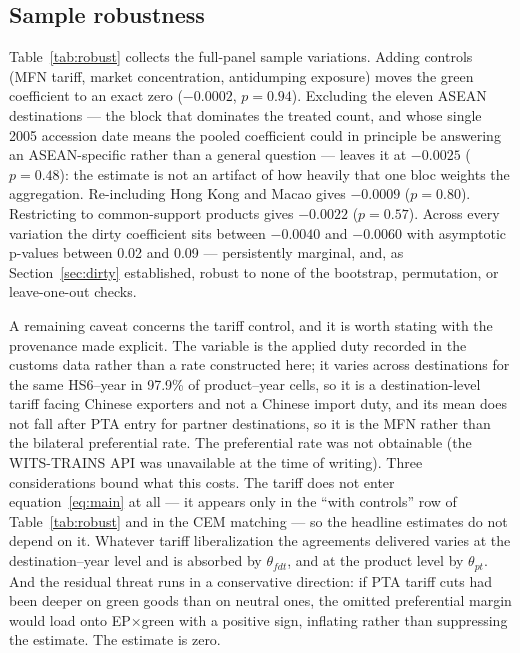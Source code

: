 \documentclass[12pt]{article}
\begin{document}
\subsection{Sample robustness}

Table~\ref{tab:robust} collects the full-panel sample variations. Adding controls (MFN
tariff, market concentration, antidumping exposure) moves the green coefficient to an
exact zero ($-0.0002$, $p=0.94$). Excluding the eleven ASEAN destinations --- the block
that dominates the treated count, and whose single 2005 accession date means the
pooled coefficient could in principle be answering an ASEAN-specific rather than a
general question --- leaves it at $-0.0025$ ($p=0.48$): the estimate is not an artifact
of how heavily that one bloc weights the aggregation. Re-including
Hong Kong and Macao gives $-0.0009$ ($p=0.80$). Restricting to common-support products
gives $-0.0022$ ($p=0.57$). Across every variation the dirty coefficient sits between
$-0.0040$ and $-0.0060$ with asymptotic p-values between 0.02 and 0.09 --- persistently
marginal, and, as Section~\ref{sec:dirty} established, robust to none of the bootstrap,
permutation, or leave-one-out checks.

\begin{table}[htbp]
\centering
\caption{Sample robustness (full firm-level panel, WB index)}
\label{tab:robust}

\end{table}

A remaining caveat concerns the tariff control, and it is worth stating with the
provenance made explicit. The variable is the applied duty recorded in the customs data
rather than a rate constructed here; it varies across destinations for the same
HS6--year in 97.9\% of product--year cells, so it is a destination-level tariff facing
Chinese exporters and not a Chinese import duty, and its mean does not fall after PTA
entry for partner destinations, so it is the MFN rather than the bilateral preferential
rate. The preferential rate was not obtainable (the WITS-TRAINS API was unavailable at
the time of writing). Three considerations bound what this costs. The tariff does not
enter equation~\eqref{eq:main} at all --- it appears only in the ``with controls'' row of
Table~\ref{tab:robust} and in the CEM matching --- so the headline estimates do not
depend on it. Whatever tariff liberalization the agreements delivered varies at the
destination--year level and is absorbed by $\theta_{fdt}$, and at the product level by
$\theta_{pt}$. And the residual threat runs in a conservative direction: if PTA tariff
cuts had been deeper on green goods than on neutral ones, the omitted preferential
margin would load onto EP$\times$green with a positive sign, inflating rather than
suppressing the estimate. The estimate is zero.
\end{document}
